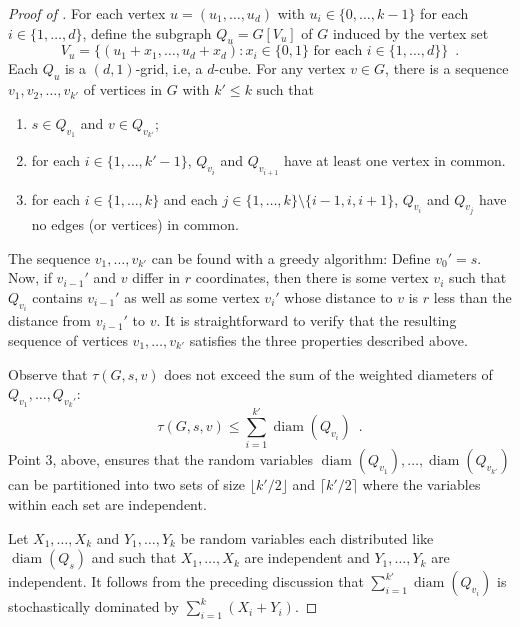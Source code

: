 \documentclass{patmorin}
\DeclareMathOperator{\diam}{diam}
\begin{document}
{\begin{proof}[Proof of ]
For each vertex $u=(u_1,\ldots,u_d)$ with $u_i\in\{0,\ldots,k-1\}$
for each $i\in\{1,\ldots,d\}$, define the subgraph
$Q_u=G[V_u]$ of $G$ induced by the vertex set
\[
    V_u = \{(u_1+x_1,\ldots,u_d+x_d) :\text{$x_i\in\{0,1\}$ for each $i\in\{1,\ldots,d\}$}\} \enspace .
\]
Each $Q_u$ is a $(d,1)$-grid, i.e, a $d$-cube.  
For any vertex $v\in G$, there is a sequence $v_1,v_2,\ldots,v_{k'}$
of vertices in $G$ with $k'\le k$ such that
\begin{enumerate}
  \item $s\in Q_{v_1}$ and $v\in Q_{v_{k'}}$; 
  \item for each $i\in\{1,\ldots,k'-1\}$, $Q_{v_{i}}$ and $Q_{v_{i+1}}$ have at least one
vertex in common.
  \item for each $i\in\{1,\ldots,k\}$ and each $j\in\{1,\ldots,k\}\setminus\{i-1,i,i+1\}$, $Q_{v_i}$ and $Q_{v_j}$ have no edges (or vertices) in common.
\end{enumerate}
The sequence $v_1,\ldots,v_{k'}$ can be found with a greedy algorithm:
Define $v_0'=s$.  Now, if $v_{i-1}'$ and $v$ differ in $r$ coordinates,
then there is some vertex $v_i$ such that $Q_{v_i}$ contains $v_{i-1}'$
as well as some vertex $v_i'$ whose distance to $v$ is $r$ less than
the distance from $v_{i-1}'$ to $v$. It is straightforward to verify
that the resulting sequence of vertices $v_1,\ldots,v_{k'}$ satisfies
the three properties described above.

Observe that $\tau(G,s,v)$ does not exceed the sum of the weighted diameters of
$Q_{v_1},\ldots,Q_{v_k'}$:
\[
   \tau(G,s,v) \le \sum_{i=1}^{k'} \diam(Q_{v_i})  \enspace .
\]
Point 3, above, ensures that the random variables
$\diam(Q_{v_1}),\ldots,\diam(Q_{v_{k'}})$ can be partitioned into two
sets of size $\lfloor k'/2\rfloor$ and $\lceil k'/2\rceil$
where the variables within each set are independent.

Let $X_1,\ldots,X_k$ and $Y_1,\ldots,Y_k$ be random variables each
distributed like $\diam(Q_s)$ and such that $X_1,\ldots,X_k$ are
independent and $Y_1,\ldots,Y_k$ are independent.  It follows from
the preceding discussion that $\sum_{i=1}^{k'}\diam(Q_{v_i})$ is
stochastically dominated by $\sum_{i=1}^k (X_i+Y_i)$.  



\end{proof}}
\end{document}
